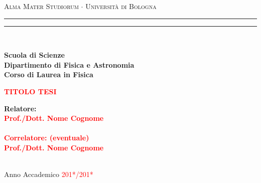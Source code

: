 \documentclass[12pt,a4paper]{report}
\begin{document}
	\begin{titlepage}
		\begin{center}
			{{\Large{\textsc{Alma Mater Studiorum $\cdot$ Universit\`a di Bologna}}}} 
			\rule[0.1cm]{15.8cm}{0.1mm}
			\rule[0.5cm]{15.8cm}{0.6mm}
			\\\vspace{3mm}
			
			{\small{\bf Scuola di Scienze \\ 
					Dipartimento di Fisica e Astronomia\\
					Corso di Laurea in Fisica}}
			
		\end{center}
		
		\vspace{23mm}
		
		\begin{center}\textcolor{red}{
				{\LARGE{\bf TITOLO TESI}}\\
		}\end{center}
		
		\vspace{50mm} \par \noindent
		
		\begin{minipage}[t]{0.47\textwidth}
			{\large{\bf Relatore: \vspace{2mm}\\\textcolor{red}{
						Prof./Dott. Nome Cognome}\\\\
					\textcolor{red}{
						\bf Correlatore: (eventuale)
						\vspace{2mm}\\
						Prof./Dott. Nome Cognome\\\\}}}
		\end{minipage}
		\hfill
		\begin{minipage}[t]{0.47\textwidth}
		\end{minipage}
		
		\vspace{40mm}
		
		\begin{center}
			Anno Accademico \textcolor{red}{ 201*/201*}
		\end{center}
		
	\end{titlepage}
	\newpage
	
\end{document}
